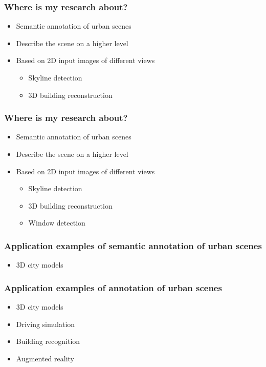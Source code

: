 \documentclass{beamer}
\begin{document}
\frame
{
}


\frame
{
	\frametitle{Where is my research about?}
	\begin{itemize}
	\item Semantic annotation of urban scenes
	\item Describe the scene on a higher level
	\item Based on 2D input images of different views
		\begin{itemize}
			\item Skyline detection
			\item <+-| alert@+> 3D building reconstruction
		\end{itemize}
	\end{itemize}
}

\frame
{
}
\frame
{
	\frametitle{Where is my research about?}
	\begin{itemize}
	\item Semantic annotation of urban scenes
	\item Describe the scene on a higher level
	\item Based on 2D input images of different views
		\begin{itemize}
			\item Skyline detection
			\item 3D building reconstruction
			\item <+-| alert@+> Window detection
		\end{itemize}
	\end{itemize}
}
\frame
{
	\frametitle{Application examples of semantic annotation of urban scenes}
	\begin{itemize}
	\item <+-| alert@+> 3D city models
	\end{itemize}
}

\frame
{
}

\frame
{
}

\frame
{
}

\frame
{
}

\frame
{
	\frametitle{Application examples of annotation of urban scenes}
	\begin{itemize}
	\item 3D city models
	\item <+-| alert@+> Driving simulation
	\item <+-| alert@+> Building recognition
	\item <+-| alert@+> Augmented reality
	\end{itemize}
}
\end{document}
